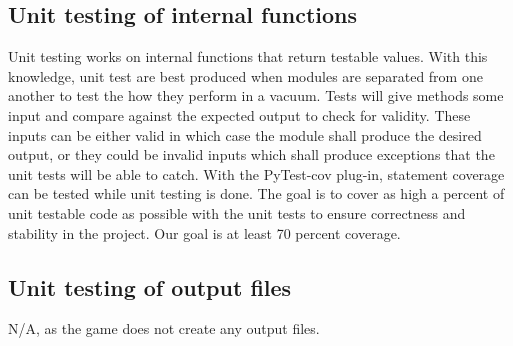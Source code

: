 \documentclass[12pt, titlepage]{article}
\begin{document}
\subsection{Unit testing of internal functions}

Unit testing works on internal functions that return testable values. With this knowledge, unit test are best produced when modules are separated from one another to test the how they perform in a vacuum. Tests will give methods some input and compare against the expected output to check for validity. These inputs can be either valid in which case the module shall produce the desired output, or they could be invalid inputs which shall produce exceptions that the unit tests will be able to catch. With the PyTest-cov plug-in, statement coverage can be tested while unit testing is done. The goal is to cover as high a percent of unit testable code as possible with the unit tests to ensure correctness and stability in the project. Our goal is at least 70 percent coverage.

\subsection{Unit testing of output files}		

N/A, as the game does not create any output files.
\end{document}
